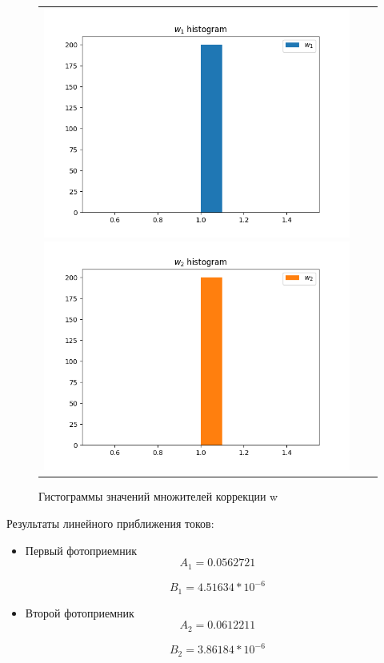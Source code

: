 \documentclass[../main.tex]{subfiles}
\begin{document}
\begin{figure}[H]
	\begin{tabular}{ccc}
		\includegraphics[scale=0.5]{figures/whyst_PR1.png}
		\includegraphics[scale=0.5]{figures/whyst_PR2.png}
	\end{tabular}
	\caption{Гистограммы значений множителей коррекции w} 
\end{figure}

Результаты линейного приближения токов:
\begin{itemize}
\item Первый фотоприемник
        \begin{equation}
            A_1 = 0.0562721
        \end{equation}
        
        \begin{equation}
            B_1 = 4.51634 *10^{-6}
        \end{equation}

\item Второй фотоприемник
        \begin{equation}
            A_2 = 0.0612211
        \end{equation}
        
        \begin{equation}
            B_2 = 3.86184 *10^{-6}
        \end{equation}
\end{itemize}
\end{document}
